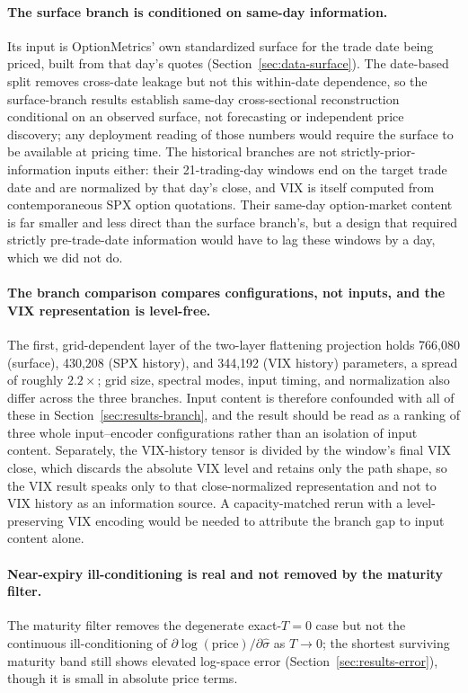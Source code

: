\documentclass[11pt]{article}
\begin{document}
\paragraph{The surface branch is conditioned on same-day information.} Its input is OptionMetrics' own
standardized surface for the trade date being priced, built from that day's quotes
(Section~\ref{sec:data-surface}). The date-based split removes cross-date leakage but not this
within-date dependence, so the surface-branch results establish same-day cross-sectional reconstruction
conditional on an observed surface, not forecasting or independent price discovery; any deployment
reading of those numbers would require the surface to be available at pricing time. The historical
branches are not strictly-prior-information inputs either: their 21-trading-day windows end on the
target trade date and are normalized by that day's close, and VIX is itself computed from
contemporaneous SPX option quotations. Their same-day option-market content is far smaller and less
direct than the surface branch's, but a design that required strictly pre-trade-date information would
have to lag these windows by a day, which we did not do.

\paragraph{The branch comparison compares configurations, not inputs, and the VIX representation is
level-free.} The first, grid-dependent layer of the two-layer flattening projection holds 766{,}080
(surface), 430{,}208 (SPX history), and
344{,}192 (VIX history) parameters, a spread of roughly $2.2\times$; grid size, spectral modes, input
timing, and normalization also differ across the three branches. Input content is therefore confounded
with all of these in Section~\ref{sec:results-branch}, and the result should be read as a ranking of
three whole input--encoder configurations rather than an isolation of input content. Separately, the
VIX-history tensor is divided by the window's final VIX close, which discards the absolute VIX level
and retains only the path shape, so the VIX result speaks only to that close-normalized representation
and not to VIX history as an information source. A capacity-matched rerun with a level-preserving VIX
encoding would be needed to attribute the branch gap to input content alone.

\paragraph{Near-expiry ill-conditioning is real and not removed by the maturity filter.} The maturity
filter removes the degenerate exact-$T{=}0$ case but not the continuous ill-conditioning of
$\partial \log(\text{price})/\partial \hat\sigma$ as $T \to 0$; the shortest surviving maturity band
still shows elevated log-space error (Section~\ref{sec:results-error}), though it is small in absolute
price terms.
\end{document}
